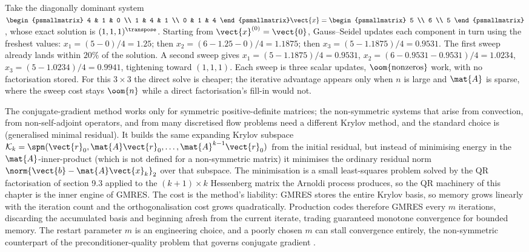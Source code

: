 \begin{example}
Take the diagonally dominant system $\begin{psmallmatrix} 4 & 1 & 0
\\ 1 & 4 & 1 \\ 0 & 1 & 4 \end{psmallmatrix}\vect{x} =
\begin{psmallmatrix} 5 \\ 6 \\ 5 \end{psmallmatrix}$, whose exact
solution is $(1, 1, 1)^{\transpose}$. Starting from $\vect{x}^{(0)}
= \vect{0}$, Gauss--Seidel updates each component in turn using the
freshest values: $x_{1} = (5 - 0)/4 = 1.25$; then $x_{2} = (6 - 1.25
- 0)/4 = 1.1875$; then $x_{3} = (5 - 1.1875)/4 = 0.9531$. The first
sweep already lands within $20\%$ of the solution. A second sweep
gives $x_{1} = (5 - 1.1875)/4 = 0.9531$, $x_{2} = (6 - 0.9531 -
0.9531)/4 = 1.0234$, $x_{3} = (5 - 1.0234)/4 = 0.9941$, tightening
toward $(1, 1, 1)$. Each sweep is three scalar updates,
$\oom{\text{nonzeros}}$ work, with no factorisation stored. For this
$3 \times 3$ the direct solve is cheaper; the iterative advantage
appears only when $n$ is large and $\mat{A}$ is sparse, where the
sweep cost stays $\oom{n}$ while a direct factorisation's fill-in
would not.
\end{example}

\begin{mastery}
The conjugate-gradient method works only for symmetric
positive-definite matrices; the non-symmetric systems that arise from
convection, from non-self-adjoint operators, and from many
discretised flow problems need a different Krylov method, and the
standard choice is  (generalised minimal residual). It
builds the same expanding Krylov subspace $\mathcal{K}_{k} =
\spn(\vect{r}_{0}, \mat{A}\vect{r}_{0}, \ldots, \mat{A}^{k-1}
\vect{r}_{0})$ from the initial residual, but instead of minimising
energy in the $\mat{A}$-inner-product (which is not defined for a
non-symmetric matrix) it minimises the ordinary residual norm
$\norm{\vect{b} - \mat{A}\vect{x}_{k}}_{2}$ over that subspace. The
minimisation is a small least-squares problem solved by the QR
factorisation of section 9.3 applied to the $(k+1) \times k$
Hessenberg matrix the Arnoldi process produces, so the QR machinery of
this chapter is the inner engine of GMRES. The cost is the method's
liability: GMRES stores the entire Krylov basis, so memory grows
linearly with the iteration count and the orthogonalisation cost grows
quadratically. Production codes therefore  GMRES
every $m$ iterations, discarding the accumulated basis and beginning
afresh from the current iterate, trading guaranteed monotone
convergence for bounded memory. The restart parameter $m$ is an
engineering choice, and a poorly chosen $m$ can stall convergence
entirely, the non-symmetric counterpart of the preconditioner-quality
problem that governs conjugate gradient
\cite[ch.~35]{text:trefethen-bau1997}.
\end{mastery}

